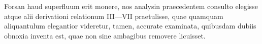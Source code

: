\expandafter\def\csname HistoricalNoteText25\endcsname{Forsan haud superfluum erit monere, nos analysin praecedentem consulto elegisse atque alii derivationi relationum III---VII praetulisse, quae quamquam aliquantulum elegantior videretur, tamen, accurate
examinata, quibusdam dubiis obnoxia inventa est, quae non sine ambagibus removere licuisset.}
